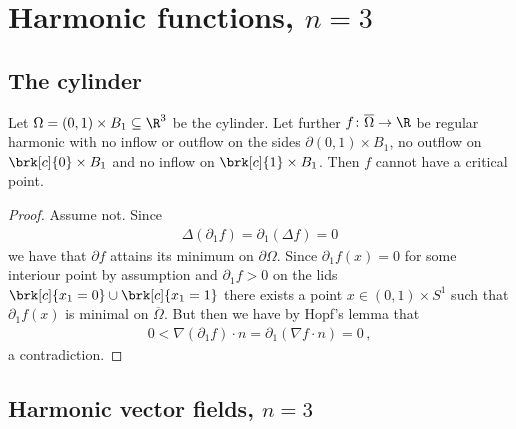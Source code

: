 \newpage

\section{Harmonic functions, $n=3$}

\subsection{The cylinder}

\begin{proposition}
  Let $\Omega=(0,1)\times B_1\subseteq\R^3$ be the cylinder. Let further $f\colon\overline{\Omega}\to\R$ be regular 
  harmonic with no inflow or outflow on the sides 
  $\partial (0,1)\times B_1$, no outflow on $\brk[c]{0}\times B_1$ and no inflow on $\brk[c]{1}\times B_1$. 
  Then $f$ cannot have a critical point.
\end{proposition}
\begin{proof}
  Assume not. Since
  \begin{align*}
    \Delta(\partial_1f)=\partial_1(\Delta f)=0
  \end{align*}
  we have that $\partial f$ attains its minimum on $\partial\Omega$. Since $\partial_1 f(x)=0$ for some interiour point 
  by assumption and $\partial_1 f>0$ on the lids $\brk[c]{x_1=0}\cup\brk[c]{x_1=1}$ there exists a point
  $x\in(0,1)\times S^1$ such that $\partial_1f(x)$ is minimal on $\overline{\Omega}$. But then we have by Hopf's lemma
  that
  \begin{align*}
    0<\nabla (\partial_1f)\cdot n=\partial_1(\nabla f\cdot n)=0\,,
  \end{align*}
  a contradiction.
\end{proof}

\newpage

\subsection{Harmonic vector fields, $n=3$}


